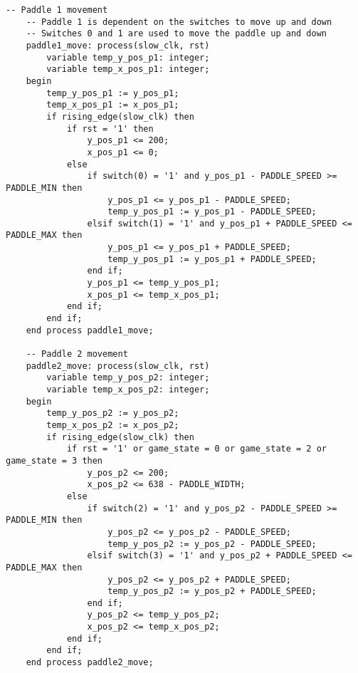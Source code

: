 \documentclass{article}
\begin{document}
\begin{lstlisting}[caption=Movement Processes, label=lst:movement-processes]
    -- Paddle 1 movement
    -- Paddle 1 is dependent on the switches to move up and down
    -- Switches 0 and 1 are used to move the paddle up and down
    paddle1_move: process(slow_clk, rst)
        variable temp_y_pos_p1: integer;
        variable temp_x_pos_p1: integer;
    begin
        temp_y_pos_p1 := y_pos_p1;
        temp_x_pos_p1 := x_pos_p1;
        if rising_edge(slow_clk) then
            if rst = '1' then
                y_pos_p1 <= 200;
                x_pos_p1 <= 0;
            else
                if switch(0) = '1' and y_pos_p1 - PADDLE_SPEED >= PADDLE_MIN then
                    y_pos_p1 <= y_pos_p1 - PADDLE_SPEED;
                    temp_y_pos_p1 := y_pos_p1 - PADDLE_SPEED;
                elsif switch(1) = '1' and y_pos_p1 + PADDLE_SPEED <= PADDLE_MAX then
                    y_pos_p1 <= y_pos_p1 + PADDLE_SPEED;
                    temp_y_pos_p1 := y_pos_p1 + PADDLE_SPEED;
                end if;
                y_pos_p1 <= temp_y_pos_p1;
                x_pos_p1 <= temp_x_pos_p1;
            end if;
        end if;
    end process paddle1_move;

    -- Paddle 2 movement
    paddle2_move: process(slow_clk, rst)
        variable temp_y_pos_p2: integer;
        variable temp_x_pos_p2: integer;
    begin
        temp_y_pos_p2 := y_pos_p2;
        temp_x_pos_p2 := x_pos_p2;
        if rising_edge(slow_clk) then
            if rst = '1' or game_state = 0 or game_state = 2 or game_state = 3 then
                y_pos_p2 <= 200;
                x_pos_p2 <= 638 - PADDLE_WIDTH;
            else
                if switch(2) = '1' and y_pos_p2 - PADDLE_SPEED >= PADDLE_MIN then
                    y_pos_p2 <= y_pos_p2 - PADDLE_SPEED;
                    temp_y_pos_p2 := y_pos_p2 - PADDLE_SPEED;
                elsif switch(3) = '1' and y_pos_p2 + PADDLE_SPEED <= PADDLE_MAX then
                    y_pos_p2 <= y_pos_p2 + PADDLE_SPEED;
                    temp_y_pos_p2 := y_pos_p2 + PADDLE_SPEED;
                end if;
                y_pos_p2 <= temp_y_pos_p2;
                x_pos_p2 <= temp_x_pos_p2;
            end if;
        end if;
    end process paddle2_move;

\end{lstlisting}
\end{document}
